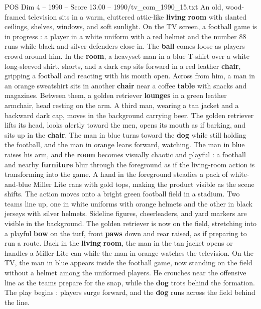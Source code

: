 \begin{textsample}{POS Dim 4 – 1990 – Score 13.00 – 1990/tv\_com\_1990\_15.txt}  \label{ex:f4_pos_076}
An old, wood-framed television sits in a warm, cluttered attic-like \textbf{living} \textbf{room} with slanted ceilings, shelves, windows, and soft sunlight.
On the TV screen, a football game is in progress : a player in a white uniform with a red helmet and the number 88 runs while black-and-silver defenders close in.
The \textbf{ball} comes loose as players crowd around him.
In the \textbf{room}, a heavyset man in a blue T-shirt over a white long-sleeved shirt, shorts, and a dark cap sits forward in a red leather \textbf{chair}, gripping a football and reacting with his mouth open.
Across from him, a man in an orange sweatshirt sits in another \textbf{chair} near a coffee \textbf{table} with snacks and magazines.
Between them, a golden retriever \textbf{lounges} in a green leather armchair, head resting on the arm.
A third man, wearing a tan jacket and a backward dark cap, moves in the background carrying beer.
The golden retriever lifts its head, looks alertly toward the men, opens its mouth as if barking, and sits up in the \textbf{chair}.
The man in blue turns toward the \textbf{dog} while still holding the football, and the man in orange leans forward, watching.
The man in blue raises his arm, and the \textbf{room} becomes visually chaotic and playful : a football and nearby \textbf{furniture} blur through the foreground as if the living-room action is transforming into the game.
A hand in the foreground steadies a pack of white-and-blue Miller Lite cans with gold tops, making the product visible as the scene shifts.
The action moves onto a bright green football field in a stadium.
Two teams line up, one in white uniforms with orange helmets and the other in black jerseys with silver helmets.
Sideline figures, cheerleaders, and yard markers are visible in the background.
The golden retriever is now on the field, stretching into a playful \textbf{bow} on the turf, front \textbf{paws} down and rear raised, as if preparing to run a route.
Back in the \textbf{living} \textbf{room}, the man in the tan jacket opens or handles a Miller Lite can while the man in orange watches the television.
On the TV, the man in blue appears inside the football game, now standing on the field without a helmet among the uniformed players.
He crouches near the offensive line as the teams prepare for the snap, while the \textbf{dog} trots behind the formation.
The play begins : players surge forward, and the \textbf{dog} runs across the field behind the line.

\end{textsample}
